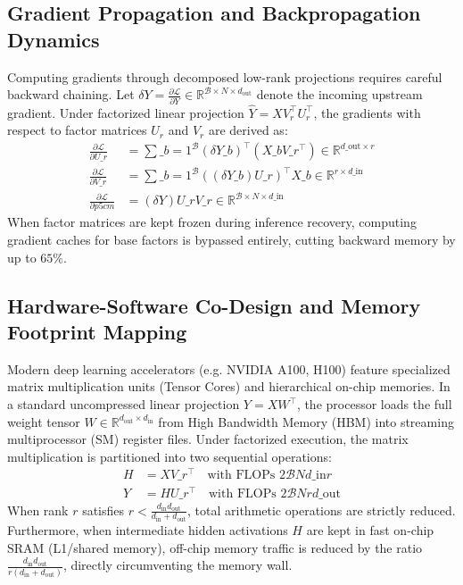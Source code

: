 \subsection{Gradient Propagation and Backpropagation Dynamics}
Computing gradients through decomposed low-rank projections requires careful backward chaining. Let $\delta Y = \frac{\partial \mathcal{L}}{\partial Y} \in \mathbb{R}^{\mathcal{B} \times N \times d_{\text{out}}}$ denote the incoming upstream gradient. Under factorized linear projection $\hat{Y} = X V_r^\top U_r^\top$, the gradients with respect to factor matrices $U_r$ and $V_r$ are derived as:
\begin{align}
\frac{\partial \mathcal{L}}{\partial U\_r} &= \sum\_{b=1}^{\mathcal{B}} (\delta Y\_b)^\top (X\_b V\_r^\top) \in \mathbb{R}^{d\_{\text{out}} \times r} \\
\frac{\partial \mathcal{L}}{\partial V\_r} &= \sum\_{b=1}^{\mathcal{B}} ((\delta Y\_b) U\_r)^\top X\_b \in \mathbb{R}^{r \times d\_{\text{in}}} \\
\frac{\partial \mathcal{L}}{\partial p{5cm}} &= (\delta Y) U\_r V\_r \in \mathbb{R}^{\mathcal{B} \times N \times d\_{\text{in}}}
\end{align}
When factor matrices are kept frozen during inference recovery, computing gradient caches for base factors is bypassed entirely, cutting backward memory by up to $65\%$.

\subsection{Hardware-Software Co-Design and Memory Footprint Mapping}
Modern deep learning accelerators (e.g. NVIDIA A100, H100) feature specialized matrix multiplication units (Tensor Cores) and hierarchical on-chip memories. In a standard uncompressed linear projection $Y = X W^\top$, the processor loads the full weight tensor $W \in \mathbb{R}^{d_{\text{out}} \times d_{\text{in}}}$ from High Bandwidth Memory (HBM) into streaming multiprocessor (SM) register files. Under factorized execution, the matrix multiplication is partitioned into two sequential operations:
\begin{align}
H &= X V\_r^\top \quad \text{with FLOPs } 2 \mathcal{B} N d\_{\text{in}} r \\
Y &= H U\_r^\top \quad \text{with FLOPs } 2 \mathcal{B} N r d\_{\text{out}}
\end{align}
When rank $r$ satisfies $r < \frac{d_{\text{in}} d_{\text{out}}}{d_{\text{in}} + d_{\text{out}}}$, total arithmetic operations are strictly reduced. Furthermore, when intermediate hidden activations $H$ are kept in fast on-chip SRAM (L1/shared memory), off-chip memory traffic is reduced by the ratio $\frac{d_{\text{in}} d_{\text{out}}}{r(d_{\text{in}} + d_{\text{out}})}$, directly circumventing the memory wall.

